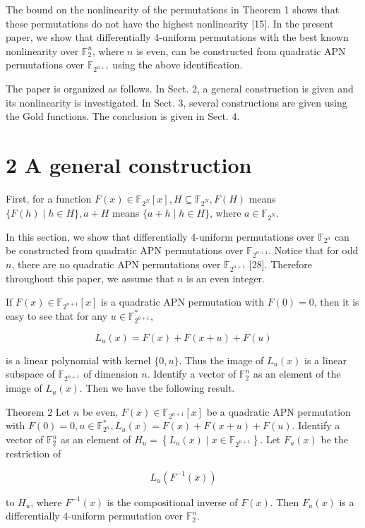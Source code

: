 \documentclass[10pt]{article}
\begin{document}
The bound on the nonlinearity of the permutations in Theorem 1 shows that these permutations do not have the highest nonlinearity [15]. In the present paper, we show that differentially 4-uniform permutations with the best known nonlinearity over $\mathbb{F}_{2}^{n}$, where $n$ is even, can be constructed from quadratic APN permutations over $\mathbb{F}_{2^{n+1}}$ using the above identification.

The paper is organized as follows. In Sect. 2, a general construction is given and its nonlinearity is investigated. In Sect. 3, several constructions are given using the Gold functions. The conclusion is given in Sect. 4.

\section*{2 A general construction}
First, for a function $F(x) \in \mathbb{F}_{2^{N}}[x], H \subseteq \mathbb{F}_{2^{N}}, F(H)$ means $\{F(h) \mid h \in H\}, a+H$ means $\{a+h \mid h \in H\}$, where $a \in \mathbb{F}_{2^{N}}$.

In this section, we show that differentially 4-uniform permutations over $\mathbb{F}_{2^{n}}$ can be constructed from quadratic APN permutations over $\mathbb{F}_{2^{n+1}}$. Notice that for odd $n$, there are no quadratic APN permutations over $\mathbb{F}_{2^{n+1}}$ [28]. Therefore throughout this paper, we assume that $n$ is an even integer.

If $F(x) \in \mathbb{F}_{2^{n+1}}[x]$ is a quadratic APN permutation with $F(0)=0$, then it is easy to see that for any $u \in \mathbb{F}_{2^{n+1}}^{*}$,

$$
L_{u}(x)=F(x)+F(x+u)+F(u)
$$

is a linear polynomial with kernel $\{0, u\}$. Thus the image of $L_{u}(x)$ is a linear subspace of $\mathbb{F}_{2^{n+1}}$ of dimension $n$. Identify a vector of $\mathbb{F}_{2}^{n}$ as an element of the image of $L_{u}(x)$. Then we have the following result.

Theorem 2 Let $n$ be even, $F(x) \in \mathbb{F}_{2^{n+1}}[x]$ be a quadratic APN permutation with $F(0)= 0, u \in \mathbb{F}_{2^{n}}^{*}, L_{u}(x)=F(x)+F(x+u)+F(u)$. Identify a vector of $\mathbb{F}_{2}^{n}$ as an element of $H_{u}=\left\{L_{u}(x) \mid x \in \mathbb{F}_{2^{n+1}}\right\}$. Let $F_{u}(x)$ be the restriction of

$$
L_{u}\left(F^{-1}(x)\right)
$$

to $H_{u}$, where $F^{-1}(x)$ is the compositional inverse of $F(x)$. Then $F_{u}(x)$ is a differentially 4-uniform permutation over $\mathbb{F}_{2}^{n}$.
\end{document}
